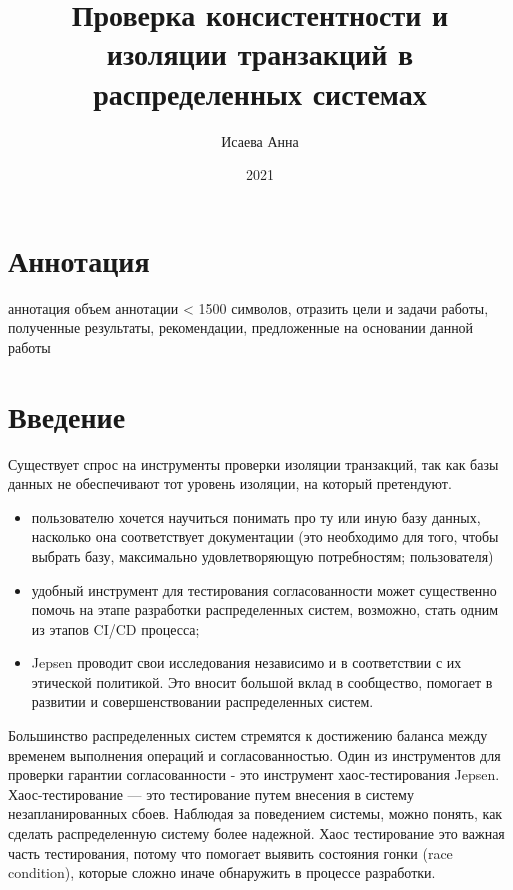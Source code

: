 \documentclass[14pt,  openany]{book}
\title{Проверка консистентности и изоляции транзакций в распределенных системах}
\author{Исаева Анна}
\date{2021}
\begin{document}
\maketitle
\chapter*{Аннотация}
\par
аннотация \newline
объем аннотации <  1500 символов,  отразить цели и задачи работы, полученные результаты, рекомендации, предложенные на основании данной работы
\setcounter{page}{2}
\tableofcontents
\clearpage



\chapter{Введение}

Существует спрос на инструменты проверки изоляции транзакций, так  как базы данных не обеспечивают тот уровень изоляции, на который претендуют.
\begin{itemize}
\item пользователю хочется научиться понимать про ту или иную базу данных, насколько она соответствует документации (это необходимо для того, чтобы выбрать базу, максимально удовлетворяющую потребностям; пользователя)
\item удобный инструмент для тестирования согласованности может существенно помочь на этапе разработки распределенных систем, возможно, стать одним из этапов CI/CD процесса;
\item Jepsen проводит свои исследования независимо и в соответствии с их этической политикой. Это вносит большой вклад в сообщество, помогает в развитии и совершенствовании распределенных систем.
\end{itemize}

Большинство распределенных систем стремятся к достижению баланса между временем выполнения операций и согласованностью.  Один из инструментов для проверки гарантии согласованности - это инструмент хаос-тестирования Jepsen.  Хаос-тестирование ---  это тестирование путем внесения в систему незапланированных сбоев.  Наблюдая за поведением системы, можно понять, как сделать распределенную систему более надежной. Хаос тестирование это важная часть тестирования, потому что помогает выявить состояния гонки (race condition), которые сложно иначе обнаружить в процессе разработки.
\end{document}
